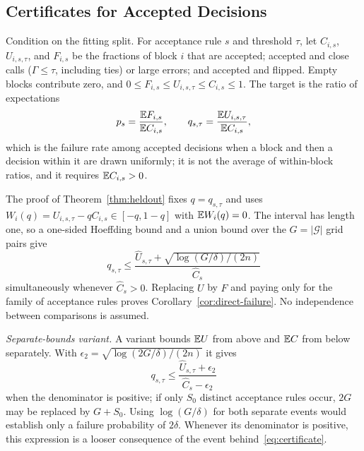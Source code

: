\subsection{Certificates for Accepted Decisions}
\label{app:p6-selective}

Condition on the fitting split. For acceptance rule $s$ and threshold $\tau$, let $C_{i,s}$, $U_{i,s,\tau}$, and $F_{i,s}$ be the fractions of block $i$ that are accepted; accepted and close calls ($\Gamma\le\tau$, including ties) or large errors; and accepted and flipped. Empty blocks contribute zero, and $0\le F_{i,s}\le U_{i,s,\tau}\le C_{i,s}\le1$. The target is the ratio of expectations
\begin{equation}
p_s=\frac{\mathbb{E} F_{i,s}}{\mathbb{E} C_{i,s}},\qquad q_{s,\tau}=\frac{\mathbb{E} U_{i,s,\tau}}{\mathbb{E} C_{i,s}},
\end{equation}
which is the failure rate among accepted decisions when a block and then a decision within it are drawn uniformly; it is not the average of within-block ratios, and it requires $\mathbb{E} C_{i,s}>0$.

The proof of Theorem~\ref{thm:heldout} fixes $q=q_{s,\tau}$ and uses $W_i(q)=U_{i,s,\tau}-qC_{i,s}\in[-q,1-q]$ with $\mathbb{E} W_i(q)=0$. The interval has length one, so a one-sided Hoeffding bound and a union bound over the $G=|\mathcal G|$ grid pairs give
\begin{equation}
q_{s,\tau}\le\frac{\widehat U_{s,\tau}+\sqrt{\log(G/\delta)/(2n)}}{\widehat C_s}
\end{equation}
simultaneously whenever $\widehat C_s>0$. Replacing $U$ by $F$ and paying only for the family of acceptance rules proves Corollary~\ref{cor:direct-failure}. No independence between comparisons is assumed.

\noindent\emph{Separate-bounds variant.}\quad
A variant bounds $\mathbb{E} U$ from above and $\mathbb{E} C$ from below separately. With $\epsilon_2=\sqrt{\log(2G/\delta)/(2n)}$ it gives
\begin{equation}
q_{s,\tau}\le\frac{\widehat U_{s,\tau}+\epsilon_2}{\widehat C_s-\epsilon_2}
\end{equation}
when the denominator is positive; if only $S_0$ distinct acceptance rules occur, $2G$ may be replaced by $G+S_0$. Using $\log(G/\delta)$ for both separate events would establish only a failure probability of $2\delta$. Whenever its denominator is positive, this expression is a looser consequence of the event behind~\eqref{eq:certificate}.

